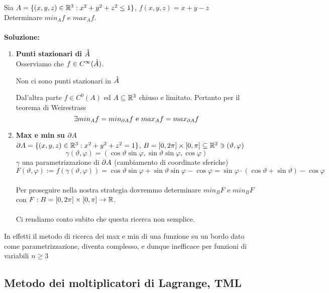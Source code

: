 \begin{example}
  Sia $A = \{(x,y,z)\in\mathbb{R}^3 : x^2+y^2+z^2 \leq 1\}$, $f(x,y,z) = x+y-z$ \\
  Determinare $min_{A} f$ e $max_{A} f$. \\\\
  \textbf{Soluzione:} 
  \begin{enumerate}
    \item \textbf{Punti stazionari di $\mathring{A}$} \\
          Osserviamo che $f \in C^{\infty}(\mathring{A})$. 
          \begin{exercise}
            Non ci sono punti stazionari in $\mathring{A}$
          \end{exercise}
          Dal'altra parte $f \in C^{0}(A)$ ed $A \subseteq \mathbb{R}^3$ \ace chiuso e limitato. Pertanto
          per il teorema di Weirestrass 
          $$\exists min_{A} f = min_{\partial A} f \text{ e } max_{A} f = max_{\partial A} f$$
    \item \textbf{Max e min su $\partial A$} \\
          $\partial A = \{(x,y,z)\in \mathbb{R}^3 : x^2+y^2+z^2 = 1\}$, $B = [0,2\pi]\times [0,\pi]\subseteq \mathbb{R}^2 \ni (\vartheta, \varphi)$
          $$\gamma(\vartheta, \varphi) = (\cos\vartheta \sin \varphi, \sin\vartheta\sin\varphi, \cos\varphi)$$ 
          $\gamma$ \ace una parametrizzazione di $\partial A$ (cambiamento di coordinate sferiche)\\
          $F(\vartheta, \varphi) := f(\gamma(\vartheta, \varphi)) = \cos\vartheta \sin \varphi + \sin\vartheta\sin\varphi - \cos\varphi = 
          \sin\varphi \cdot (\cos\vartheta+\sin\vartheta) - \cos\varphi$ \\\\
          Per proseguire nella nostra strategia dovremmo determinare $min_{B} F$ e $min_{B} F$ con $F : B = [0,2\pi]\times [0,\pi] \to \mathbb{R}$. \\\\
          Ci rendiamo conto subito che questa ricerca non \ace semplice.
  \end{enumerate}
\end{example}
\begin{osservazione}
  In effetti il metodo di ricerca dei max e min di una funzione su un bordo dato come parametrizzazione, diventa complesso, e dunque
  inefficace per funzioni di variabili $n\geq 3$
\end{osservazione}
\subsection{Metodo dei moltiplicatori di Lagrange, TML}
